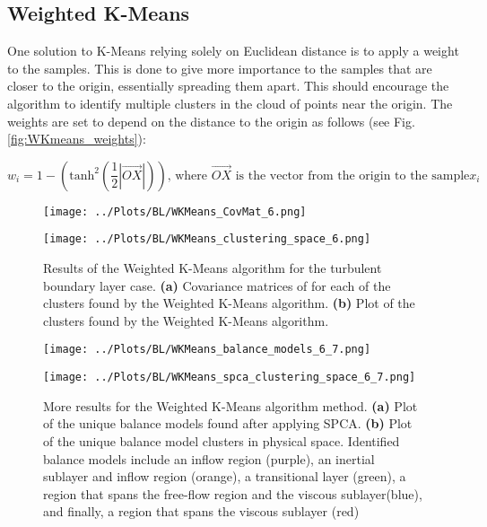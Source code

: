 \documentclass[12pt]{report} %
\begin{document}
\subsection{Weighted K-Means}

One solution to K-Means relying solely on Euclidean distance is to apply a weight to the samples. This is done to give more importance to the samples that are closer to the origin, essentially spreading them apart. This should encourage the algorithm to identify multiple clusters in the cloud of points near the origin. The weights are set to depend on the distance to the origin as follows (see Fig. \ref{fig:WKmeans_weights}):

\begin{equation}
  w_i = 1 - (\text{tanh}^{2}(\frac{1}{2}|\vec{OX}|)) \text{, where } \vec{OX} \text{ is the vector from the origin to the sample} x_i
\end{equation}

\begin{figure}[htbp]
  \centering
  \begin{minipage}{0.9\textwidth}
    \centering
    \texttt{[image: ../Plots/BL/WKMeans\_CovMat\_6.png]}
    \subcaption{}
  \end{minipage}

  \begin{minipage}{0.8\textwidth}
    \centering
    \texttt{[image: ../Plots/BL/WKMeans\_clustering\_space\_6.png]}
    \subcaption{}
  \end{minipage}

  \caption{Results of the Weighted K-Means algorithm for the turbulent boundary layer case. \textbf{(a)} Covariance matrices of for each of the clusters found by the Weighted K-Means algorithm. \textbf{(b)} Plot of the clusters found by the Weighted K-Means algorithm.}
  \label{fig:WKMeans_results_1}
\end{figure}

\begin{figure}[htbp]
  \centering
  \begin{minipage}[b]{0.6\textwidth}
      \centering
      \texttt{[image: ../Plots/BL/WKMeans\_balance\_models\_6\_7.png]}
      \subcaption{}
  \end{minipage}

  \begin{minipage}[b]{0.8\textwidth}
      \centering
      \texttt{[image: ../Plots/BL/WKMeans\_spca\_clustering\_space\_6\_7.png]}
      \subcaption{}
  \end{minipage}

  \caption{More results for the Weighted K-Means algorithm method. \textbf{(a)} Plot of the unique balance models found after applying SPCA. \textbf{(b)} Plot of the unique balance model clusters in physical space. Identified balance models include an inflow region (purple), an inertial sublayer and inflow region (orange), a transitional layer (green), a region that spans the free-flow region and the viscous sublayer(blue), and finally, a region that spans the viscous sublayer (red)}
  \label{fig:WKMeans_results_2}
\end{figure}
\end{document}
